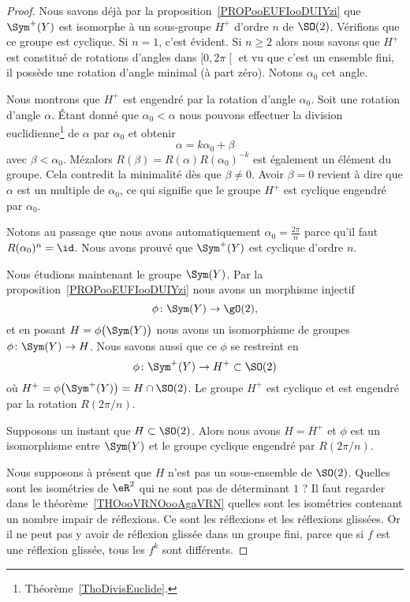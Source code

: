 \begin{proof}
	Nous savons déjà par la proposition~\ref{PROPooEUFIooDUIYzi} que \( \Sym^+(Y)\) est isomorphe à un sous-groupe \( H^+\) d'ordre \( n\) de \( \SO(2)\). Vérifions que ce groupe est cyclique. Si \( n=1\), c'est évident. Si \( n\geq 2\) alors nous savons que \( H^+\) est constitué de rotations d'angles dans \( \mathopen[ 0 , 2\pi \mathclose[\) et vu que c'est un ensemble fini, il possède une rotation d'angle minimal (à part zéro). Notons \( \alpha_0\) cet angle.

	Nous montrons que \( H^+\) est engendré par la rotation d'angle \( \alpha_0\). Soit une rotation d'angle \( \alpha\). Étant donné que \( \alpha_0<\alpha\) nous pouvons effectuer la division euclidienne\footnote{Théorème~\ref{ThoDivisEuclide}.} de \( \alpha\) par \( \alpha_0\) et obtenir
	\begin{equation}
		\alpha=k\alpha_0+\beta
	\end{equation}
	avec \( \beta<\alpha_0\). Mézalors \( R(\beta)=R(\alpha)R(\alpha_0)^{-k}\) est également un élément du groupe. Cela contredit la minimalité dès que \( \beta\neq 0\). Avoir \( \beta=0\) revient à dire que \( \alpha\) est un multiple de \( \alpha_0\), ce qui signifie que le groupe \( H^+\) est cyclique engendré par \( \alpha_0\).

	Notons au passage que nous avons automatiquement \( \alpha_0=\frac{ 2\pi }{ n }\) parce qu'il faut \( R(\alpha_0)^n=\id\). Nous avons prouvé que \( \Sym^+(Y) \) est cyclique d'ordre \( n\).

	Nous étudions maintenant le groupe \( \Sym(Y)\). Par la proposition~\ref{PROPooEUFIooDUIYzi} nous avons un morphisme injectif
	\begin{equation}
		\phi\colon \Sym(Y)\to \gO(2),
	\end{equation}
	et en posant \( H=\phi\big( \Sym(Y) \big)\) nous avons un isomorphisme de groupes \( \phi\colon \Sym(Y)\to H\). Nous savons aussi que ce \( \phi\) se restreint en
	\begin{equation}
		\phi\colon   \Sym^+(Y) \to H^+\subset\SO(2)
	\end{equation}
	où \( H^+=\phi\big( \Sym^+(Y) \big)=H\cap\SO(2)\). Le groupe \( H^+\) est cyclique et est engendré par la rotation \( R(2\pi/n)\).

	Supposons un instant que \( H\subset \SO(2)\). Alors nous avons \( H=H^+\) et \( \phi\) est un isomorphisme entre \( \Sym(Y)\) et le groupe cyclique engendré par \( R(2\pi/n)\).

	Nous supposons à présent que \( H\) n'est pas un sous-ensemble de \( \SO(2)\). Quelles sont les isométries de \( \eR^2\) qui ne sont pas de déterminant \( 1\) ? Il faut regarder dans le théorème~\ref{THOooVRNOooAgaVRN} quelles sont les isométries contenant un nombre impair de réflexions. Ce sont les réflexions et les réflexions glissées. Or il ne peut pas y avoir de réflexion glissée dans un groupe fini, parce que si \( f\) est une réflexion glissée, tous les \( f^k\) sont différents.


\end{proof}
